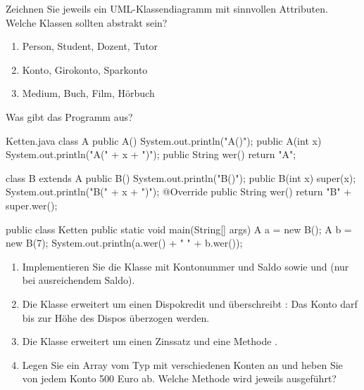 \ueben
{}
Zeichnen Sie jeweils ein UML-Klassendiagramm mit sinnvollen Attributen. Welche Klassen sollten abstrakt sein?
\begin{enumerate}[label=\alph*)]
\item Person, Student, Dozent, Tutor
\item Konto, Girokonto, Sparkonto
\item Medium, Buch, Film, Hörbuch
\end{enumerate}

Was gibt das Programm aus?
\begin{javacode}{Ketten.java}
class A {
	public A() { System.out.println("A()"); }
	public A(int x) { System.out.println("A(" + x + ")"); }
	public String wer() { return "A"; }
}

class B extends A {
	public B() { System.out.println("B()"); }
	public B(int x) { super(x); System.out.println("B(" + x + ")"); }
	@Override
	public String wer() { return "B" + super.wer(); }
}

public class Ketten {
	public static void main(String[] args) {
		A a = new B();
		A b = new B(7);
		System.out.println(a.wer() + " " + b.wer());
	}
}
\end{javacode}

\begin{enumerate}[label=\alph*)]
\item Implementieren Sie die Klasse  mit Kontonummer und Saldo sowie  und  (nur bei ausreichendem Saldo).
\item Die Klasse  erweitert  um einen Dispokredit und überschreibt : Das Konto darf bis zur Höhe des Dispos überzogen werden.
\item Die Klasse  erweitert  um einen Zinssatz und eine Methode .
\item Legen Sie ein Array vom Typ  mit verschiedenen Konten an und heben Sie von jedem Konto 500 Euro ab. Welche Methode wird jeweils ausgeführt?
\end{enumerate}


